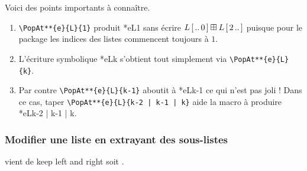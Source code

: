\documentclass[12pt,a4paper]{article}
\begin{document}
\begin{remark}
	Voici des points importants à connaître.
	\begin{enumerate}
		\item \verb#\PopAt**{e}{L}{1}# produit \PopAt**{e}{L}{1} sans écrire $L\left[ \, ..\,0 \, \right] \mathbin{\boxplus} L\left[ \, 2\,.. \, \right]$ puisque pour le package les indices des listes commencent toujours à $1$.

		\smallskip
		\item L'écriture symbolique \PopAt**{e}{L}{k} s'obtient tout simplement via \verb#\PopAt**{e}{L}{k}#.

		\smallskip
		\item Par contre \verb#\PopAt**{e}{L}{k-1}# aboutit à \PopAt**{e}{L}{k-1} ce qui n'est pas joli ! 
	          Dans ce cas, taper \verb#\PopAt**{e}{L}{k-2 | k-1 | k}# aide la macro à produire \PopAt**{e}{L}{k-2 | k-1 | k}.
	\end{enumerate}
\end{remark}




\subsubsection{Modifier une liste en extrayant des sous-listes}

\newparaexample{}

 vient de \og keep left and right \fg{} soit .

\begin{latexex}

\end{latexex}




\newparaexample{}

\begin{latexex}

\end{latexex}
\end{document}

